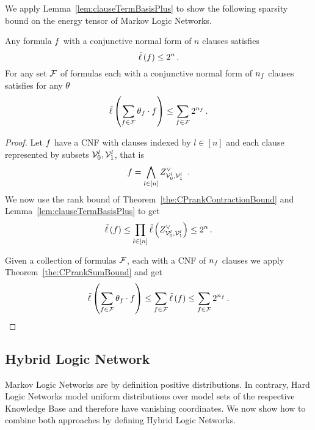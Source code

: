 We apply Lemma~\ref{lem:clauseTermBasisPlus} to show the following sparsity bound on the energy tensor of Markov Logic Networks.

\begin{theorem}
	Any formula $f$ with a conjunctive normal form of $n$ clauses satisfies
		\[ \tilde{\ell} \left(f\right) \leq 2^{n} \, . \]
	For any set $\mathcal{F}$ of formulas each with a conjunctive normal form of $n_{f}$ clauses satisfies for any $\theta$
		\[ \tilde{\ell} \left(\sum_{f\in\mathcal{F}}\theta_{f}\cdot f\right) \leq \sum_{f\in\mathcal{F}}2^{n_{f}} \, . \]
\end{theorem}
\begin{proof}
	Let $f$ have a CNF with clauses indexed by $l\in[n]$ and each clause represented by subsets $\mathcal{V}_0^l, \mathcal{V}_1^l$, that is
		\[ \exformula = \bigwedge_{l \in [n]}  \clauseof{\nodes_0^l}{\nodes_1^l} \, . \]
	We now use the rank bound of Theorem~\ref{the:CPrankContractionBound} and Lemma~\ref{lem:clauseTermBasisPlus} to get
	\begin{align*}
		\tilde{\ell} \left(f\right) \leq \prod_{l \in [n]}  \tilde{\ell} \left(Z^{\lor}_{\mathcal{V}_0^l,\mathcal{V}_1^l}\right) \leq 2^n \, . 
	\end{align*}
	
	Given a collection of formulas $\mathcal{F}$, each with a CNF of $n_{f}$ clauses we apply Theorem~\ref{the:CPrankSumBound} and get
	\begin{align*}
		\tilde{\ell} \left(\sum_{f\in\mathcal{F}}\theta_{f}\cdot f\right) \leq \sum_{f\in\mathcal{F}}\tilde{\ell} \left(f\right) \leq \sum_{f\in\mathcal{F}}2^{n_{f}} \, . 
	\end{align*}
\end{proof}






\subsection{Hybrid Logic Network}

Markov Logic Networks are by definition positive distributions.
In contrary, Hard Logic Networks model uniform distributions over model sets of the respective Knowledge Base and therefore have vanishing coordinates.
We now show how to combine both approaches by defining Hybrid Logic Networks.

